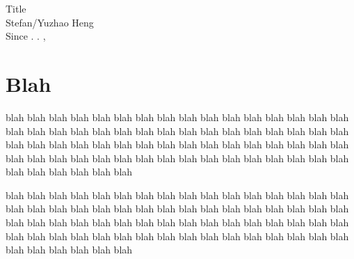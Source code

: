 \documentclass[10pt]{article}
\newlength\tindent
\renewcommand{\indent}{\hspace*{\tindent}}
\newcommand{\mydate}{\shortdayofweekname{\day}{\month}{\year}. \shortmonthname. \nth{\day}, \the\year{}}
\begin{document}
\begin{center}
    \Large Title \vspace{0.2cm} \\
    \large Stefan/Yuzhao Heng \vspace{0.2cm} \\
    \normalsize Since \mydate
\end{center}



\section*{Blah}
\indent
blah blah blah blah blah blah blah blah blah blah blah blah blah blah
blah blah blah blah blah blah blah blah blah blah blah blah blah blah
blah blah blah blah blah blah blah blah blah blah blah blah blah blah
blah blah blah blah blah blah blah blah blah blah blah blah blah blah
blah blah blah blah blah blah blah blah blah blah blah blah blah blah \par


\indent
blah blah blah blah blah blah blah blah blah blah blah blah blah blah
blah blah blah blah blah blah blah blah blah blah blah blah blah blah
blah blah blah blah blah blah blah blah blah blah blah blah blah blah
blah blah blah blah blah blah blah blah blah blah blah blah blah blah
blah blah blah blah blah blah blah blah blah blah blah blah blah blah \par
\end{document}

